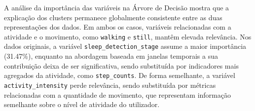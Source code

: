 \begin{table}[H]
\centering
\caption{Importância Relativa das Variáveis na Árvore de Decisão (Ordenada)}
\label{tab:importancia_gini}
\end{table}

A análise da importância das variáveis na Árvore de Decisão mostra que a explicação dos clusters permanece globalmente consistente entre as duas representações dos dados. Em ambos os casos, variáveis relacionadas com a atividade e o movimento, como \texttt{walking} e \texttt{still}, mantêm elevada relevância. Nos dados originais, a variável \texttt{sleep\_detection\_stage} assume a maior importância (31.47\%), enquanto na abordagem baseada em janelas temporais a sua contribuição deixa de ser significativa, sendo substituída por indicadores mais agregados da atividade, como \texttt{step\_counts}. De forma semelhante, a variável \texttt{activity\_intensity} perde relevância, sendo substituída por métricas relacionadas com a quantidade de movimento, que representam informação semelhante sobre o nível de atividade do utilizador.

